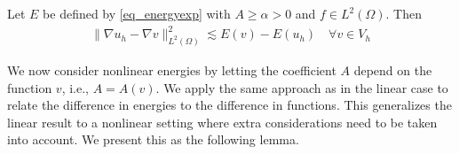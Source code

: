 \documentclass[12pt]{article}
\begin{document}
\begin{cor}\label{cor:linenergyineq}
Let $E$ be defined by \eqref{eq_energyexp} with $A \geq \alpha > 0$ and $f \in L^2(\Omega)$. Then
\begin{align}
\| \nabla u_{h} - \nabla v \|_{L^2(\Omega)}^2 \lesssim E(v) - E(u_{h}) \quad \forall v \in V_h
\end{align}
\end{cor}

We now consider nonlinear energies by letting the coefficient $A$ depend on the function $v$, i.e., $A = A(v)$. We apply the same approach as in the linear case to relate the difference in energies to the difference in functions. This generalizes the linear result to a nonlinear setting where extra considerations need to be taken into account. We present this as the following lemma.
\end{document}
